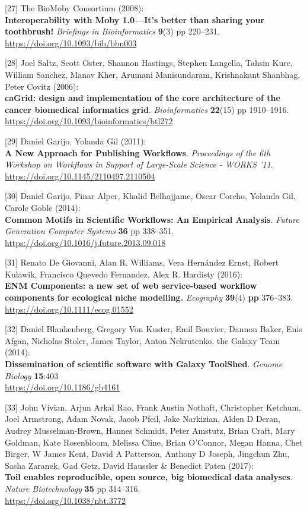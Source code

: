 {[}27{]} The BioMoby Consortium (2008):\\
\textbf{Interoperability with Moby 1.0---It's better than sharing your
toothbrush!} \emph{Briefings in Bioinformatics} \textbf{9}(3) pp
220--231.\\
\url{https://doi.org/10.1093/bib/bbn003}

{[}28{]} Joel Saltz, Scott Oster, Shannon Hastings, Stephen Langella,
Tahsin Kurc, William Sanchez, Manav Kher, Arumani Manisundaram,
Krishnakant Shanbhag, Peter Covitz (2006):\\
\textbf{caGrid: design and implementation of the core architecture of
the cancer biomedical informatics grid}. \emph{Bioinformatics}
\textbf{22}(15) pp 1910--1916.\\
\url{https://doi.org/10.1093/bioinformatics/btl272}

{[}29{]} Daniel Garijo, Yolanda Gil (2011):\\
\textbf{A New Approach for Publishing Workflows}. \emph{Proceedings of
the 6th Workshop on Workflows in Support of Large-Scale Science - WORKS
'11}.\\
\url{https://doi.org/10.1145/2110497.2110504}

{[}30{]} Daniel Garijo, Pinar Alper, Khalid Belhajjame, Oscar Corcho,
Yolanda Gil, Carole Goble (2014):\\
\textbf{Common Motifs in Scientific Workflows: An Empirical Analysis}.
\emph{Future Generation Computer Systems} \textbf{36} pp 338--351.\\
\url{https://doi.org/10.1016/j.future.2013.09.018}

{[}31{]} Renato De Giovanni, Alan R. Williams, Vera Hernández Ernst,
Robert Kulawik, Francisco Quevedo Fernandez, Alex R. Hardisty (2016):\\
\textbf{ENM Components: a new set of web service‐based workflow
components for ecological niche modelling.} \emph{Ecography}
\textbf{39}(4) \textbf{pp} 376--383.\\
\url{https://doi.org/10.1111/ecog.01552}

{[}32{]} Daniel Blankenberg, Gregory Von Kuster, Emil Bouvier, Dannon
Baker, Enis Afgan, Nicholas Stoler, James Taylor, Anton Nekrutenko, the
Galaxy Team (2014):\\
\textbf{Dissemination of scientific software with Galaxy ToolShed}.
\emph{Genome Biology} \textbf{15}:403\\
\url{https://doi.org/10.1186/gb4161}

{[}33{]} John Vivian, Arjun Arkal Rao, Frank Austin Nothaft, Christopher
Ketchum, Joel Armstrong, Adam Novak, Jacob Pfeil, Jake Narkizian, Alden
D Deran, Audrey Musselman-Brown, Hannes Schmidt, Peter Amstutz, Brian
Craft, Mary Goldman, Kate Rosenbloom, Melissa Cline, Brian O'Connor,
Megan Hanna, Chet Birger, W James Kent, David A Patterson, Anthony D
Joseph, Jingchun Zhu, Sasha Zaranek, Gad Getz, David Haussler \&
Benedict Paten (2017):\\
\textbf{Toil enables reproducible, open source, big biomedical data
analyses}. \emph{Nature Biotechnology} \textbf{35} pp 314--316.\\
\url{https://doi.org/10.1038/nbt.3772}

